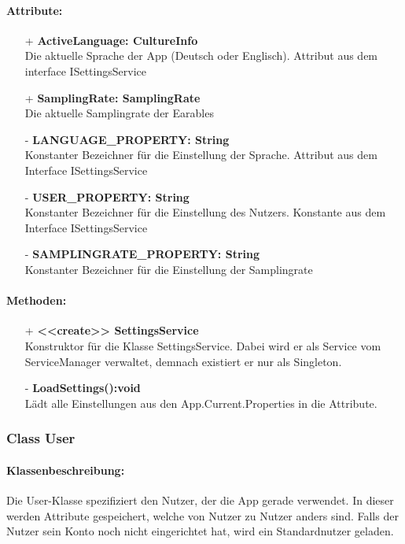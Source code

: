 \documentclass[a4paper,12pt]{article}
\begin{document}
	\paragraph{Attribute:}
	\begin{itemize}
		\item[+] \textbf{ActiveLanguage: CultureInfo}\\Die aktuelle Sprache der App (Deutsch oder Englisch). Attribut aus dem interface ISettingsService\\
		\item[+] \textbf{SamplingRate: SamplingRate}\\Die aktuelle Samplingrate der \Gls{Earables} \\ 
		\item[-] \textbf{LANGUAGE\_PROPERTY: String}\\Konstanter Bezeichner für die Einstellung der Sprache. Attribut aus dem Interface ISettingsService \\
		\item[-] \textbf{USER\_PROPERTY: String}\\Konstanter Bezeichner für die Einstellung des Nutzers. Konstante aus dem Interface ISettingsService \\
		\item[-] \textbf{SAMPLINGRATE\_PROPERTY: String}\\Konstanter Bezeichner für die Einstellung der Samplingrate \\
	\end{itemize}
	\paragraph{Methoden:}
	\begin{itemize}
		\item[+] \textbf{<<create>> SettingsService}\\Konstruktor für die Klasse SettingsService. Dabei wird er als Service vom ServiceManager verwaltet, demnach existiert er nur als Singleton.
		\item[-] \textbf{LoadSettings():void}\\Lädt alle Einstellungen aus den App.Current.Properties in die Attribute.	
	\end{itemize}
\subsubsection{Class User}
	\paragraph{Klassenbeschreibung:}
	Die User-Klasse spezifiziert den Nutzer, der die App gerade verwendet. In dieser werden Attribute gespeichert, welche von Nutzer zu Nutzer anders sind. Falls der Nutzer sein Konto noch nicht eingerichtet hat, wird ein Standardnutzer geladen.\\
\end{document}
